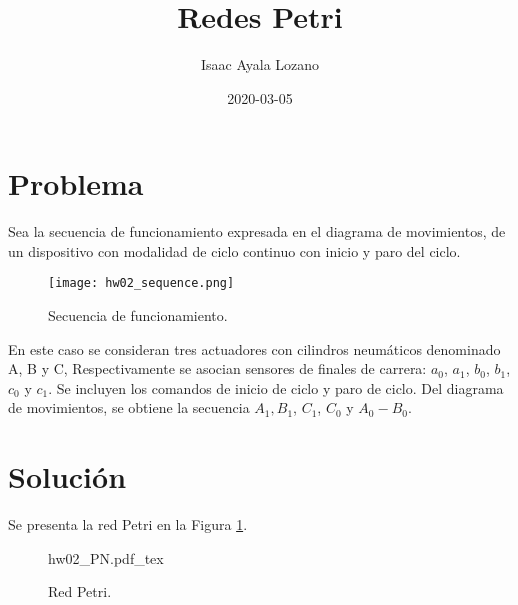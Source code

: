 \documentclass[a4paper,12pt]{article}
\title{Redes Petri}
\author{Isaac Ayala Lozano}
\date{2020-03-05}
\begin{document}
\maketitle

\section{Problema}
Sea la secuencia de
funcionamiento expresada en el
diagrama de movimientos, de un
dispositivo con modalidad de ciclo
continuo con inicio y paro del ciclo.

\begin{figure}[htb!]
\centering
\texttt{[image: hw02\_sequence.png]}
 \caption{Secuencia de funcionamiento.}
\end{figure}


En este caso se consideran tres actuadores con cilindros neumáticos
denominado A, B y C,
Respectivamente se asocian sensores de finales de carrera:
$a_0$, $a_1$, $b_0$, $b_1$, $ c_0 $ y $ c_1$.
Se incluyen los comandos de inicio de ciclo y paro de ciclo.
Del diagrama de movimientos, se obtiene la secuencia $A_1, $$ B_1$, $ C_1$, $ C_0 $ y $ A_0-B_0$.

\section{Solución}

Se presenta la red Petri en la Figura \ref{fig: PN}.

\begin{figure}[htb!]
{hw02_PN.pdf_tex}
 \caption{Red Petri.}
 \label{fig: PN}
\end{figure}
\end{document}

